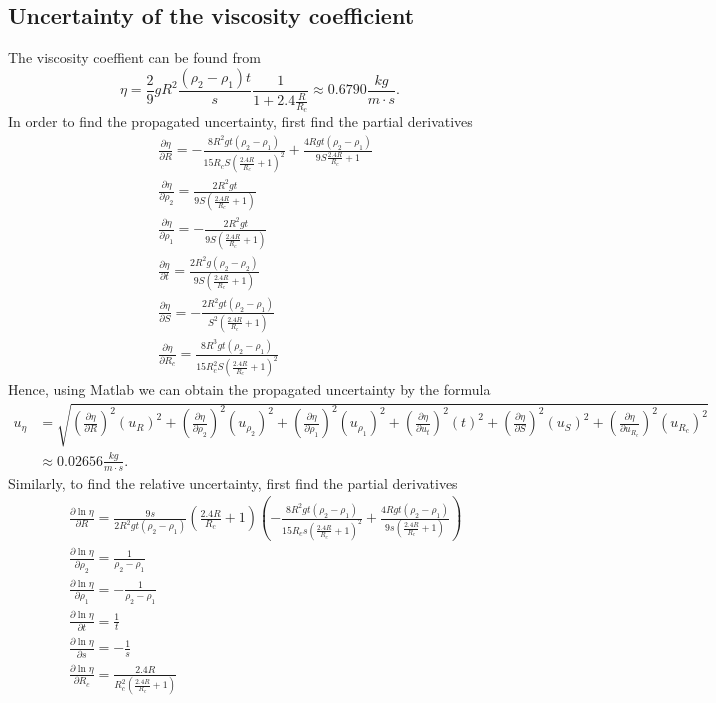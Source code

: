 \subsection{Uncertainty of the viscosity coefficient}
    The viscosity coeffient can be found from
    \[
        \eta=\frac{2}{9}gR^2\frac{(\rho_2-\rho_1)t}{s}\frac{1}{1+2.4\frac{R}{R_c}}\approx 0.6790\frac{kg}{m\cdot s}.
    \]
    In order to find the propagated uncertainty, first find the partial derivatives
    \[
    \begin{split}
        &\frac{\partial\eta}{\partial R}=- \frac{8R^{2}gt(\rho_2-\rho_1)}{15R_{c}S(\frac{2.4R}{R_{c}}+1)^2} + \frac{4Rgt(\rho_2-\rho_1)}{9S\frac{2.4R}{R_{c}}+1}\\
        &\frac{\partial\eta}{\partial \rho_2}=\frac{2R^{2} g t}{9S(\frac{2.4 R}{R_{c}} + 1)}\\
        &\frac{\partial\eta}{\partial \rho_1}=-\frac{2R^{2} g t}{9S(\frac{2.4 R}{R_{c}} + 1)}\\
        &\frac{\partial\eta}{\partial t}=\frac{2R^2 g (\rho_2-\rho_2)}{9S (\frac{2.4 R}{R_{c}}+1)}\\
        &\frac{\partial\eta}{\partial S}=-\frac{2R^2 g t (\rho_{2} - \rho_{1})}{S^{2} (\frac{2.4 R}{R_{c}} + 1)}\\
        &\frac{\partial\eta}{\partial R_c}=\frac{8R^{3} g t (\rho_{2} - \rho_{1})}{15R_{c}^{2} S (\frac{2.4 R}{R_{c}} + 1)^{2}}
    \end{split}
    \]
    Hence, using Matlab we can obtain the propagated uncertainty by the formula
    \[
    \begin{split}
        u_{\eta}&=\sqrt{(\frac{\partial\eta}{\partial R})^2(u_R)^2+(\frac{\partial\eta}{\partial \rho_2})^2(u_{\rho_2})^2+(\frac{\partial\eta}{\partial \rho_1})^2(u_{\rho_1})^2+(\frac{\partial\eta}{\partial u_t})^2(t)^2+(\frac{\partial\eta}{\partial S})^2(u_S)^2+(\frac{\partial\eta}{\partial u_{R_c}})^2(u_{R_c})^2}\\
        &\approx 0.02656\frac{kg}{m\cdot s}.
    \end{split}
    \]
    Similarly, to find the relative uncertainty, first find the partial derivatives
    \[
    \begin{split}
        &\frac{\partial\ln\eta}{\partial R}=\frac{9 s}{2 R^{2} g t \left(\rho_{2} - \rho_{1}\right)} \left(\frac{2.4 R}{R_{c}} + 1\right) \left(- \frac{8 R^{2} g t \left(\rho_{2} - \rho_{1}\right)}{15R_{c} s \left(\frac{2.4 R}{R_{c}} + 1\right)^{2}} + \frac{4 R g t \left(\rho_{2} - \rho_{1}\right)}{9s \left(\frac{2.4 R}{R_{c}} + 1\right)}\right)\\
        &\frac{\partial\ln\eta}{\partial \rho_2}=\frac{1}{\rho_2-\rho_1}\\
        &\frac{\partial\ln\eta}{\partial \rho_1}=-\frac{1}{\rho_2-\rho_1}\\
        &\frac{\partial\ln\eta}{\partial t}=\frac{1}{t}\\
        &\frac{\partial\ln\eta}{\partial s}=-\frac{1}{s}\\
        &\frac{\partial\ln\eta}{\partial R_c}=\frac{2.4 R}{R_{c}^{2} \left(\frac{2.4 R}{R_{c}} + 1\right)}
    \end{split}
    \]
